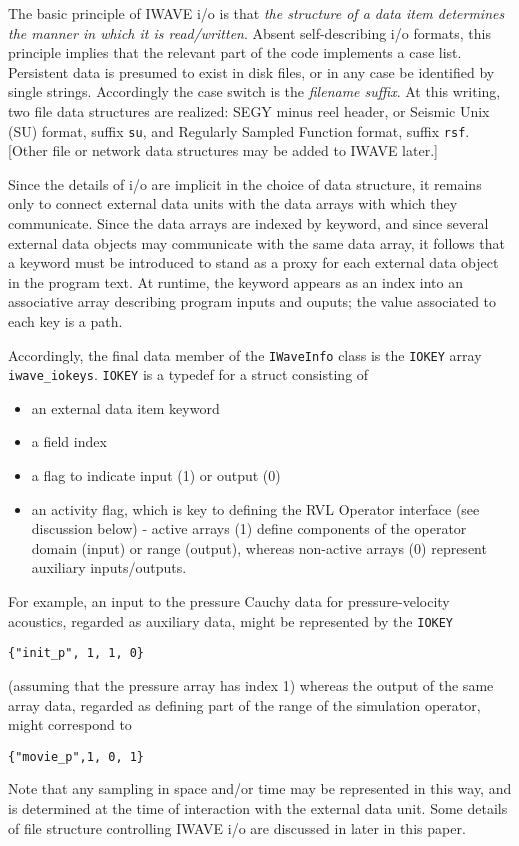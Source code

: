 The basic principle of IWAVE i/o is that {\em the structure of a data item
  determines the manner in which it is read/written}. Absent
self-describing i/o formats, this principle implies that the
relevant part of the code implements a case list. Persistent data is
presumed to exist in disk files, or in any case be identified by
single strings. Accordingly the case switch is the {\em filename suffix}. At
this writing, two file data structures are realized: SEGY minus reel
header, or Seismic Unix (SU) format, suffix {\tt su}, and Regularly
Sampled Function format, suffix {\tt rsf}. [Other file or network data
structures may be added to IWAVE later.]

Since the details of i/o are implicit in the choice of data structure,
it remains only to connect external data units with the data arrays
with which they communicate. Since the data arrays are indexed by
keyword, and since several external data objects may communicate with
the same data array, it follows that a keyword must be introduced to
stand as a proxy for
each external data object in the program text. At runtime, the keyword
appears as an index into an associative array describing program
inputs and ouputs; the value associated to each key is a path. 

Accordingly, the final data member of the
{\tt IWaveInfo} class is the {\tt IOKEY} array {\tt
  iwave\_iokeys}. {\tt IOKEY} is a typedef for a struct consisting of
\begin{itemize}
\item an external data item keyword
\item a field index
\item a flag to indicate input (1) or output (0)
\item an activity flag, which is key to defining the RVL Operator
  interface (see discussion below) - active arrays (1) define
  components of the operator domain (input) or range (output), whereas
  non-active arrays (0) represent auxiliary inputs/outputs.
\end{itemize}
For example, an input to the pressure Cauchy data for
pressure-velocity acoustics, regarded as auxiliary data, might be
represented by the {\tt IOKEY}
\begin{verbatim}
{"init_p", 1, 1, 0}
\end{verbatim}
(assuming that the pressure array has index 1) whereas the output of the same array data, regarded as defining part
of the range of the simulation operator, might correspond to
\begin{verbatim}
{"movie_p",1, 0, 1}
\end{verbatim}
Note that any sampling in space and/or time may be represented in this
way, and is determined at the time of interaction with the external
data unit. Some details of file structure controlling IWAVE i/o are
discussed in later in this paper.

